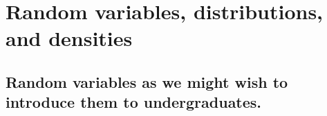 

\section{Random variables, distributions, and densities}

\subsection{Random variables as we might wish to introduce them to
  undergraduates.}


